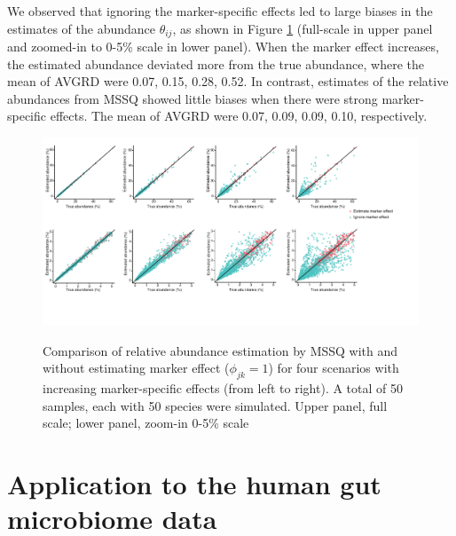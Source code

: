 We observed that ignoring the marker-specific effects led to large biases in  the estimates of the abundance $\theta_{ij}$, as shown in Figure \ref{F33_2016_02_07_Abundance_Estimation_Scale5_100_Merge} (full-scale in upper panel and zoomed-in to 0-5\% scale in lower panel). When the marker effect increases, the estimated abundance deviated more from the true abundance, where the mean of AVGRD were  0.07, 0.15, 0.28, 0.52.  In contrast, estimates of the relative abundances from MSSQ showed  little biases when there were strong marker-specific effects. The mean of AVGRD were 0.07, 0.09, 0.09, 0.10, respectively. 

\begin{figure}[ht]
	\centering
	{\includegraphics[scale=0.53,trim=0 60 20 0,clip]{Figure/F33_2016_02_07_Abundance_Estimation_Scale5_100_Merge.pdf}}
	\caption[Comparison of relative abundance estimation by MSSQ  with and without estimating marker effect]{Comparison of relative abundance estimation by MSSQ  with and without estimating marker effect ($\phi_{jk}=1$) for four scenarios with increasing marker-specific effects (from left to right). A total of 50 samples, each with 50 species were simulated. Upper panel, full scale; lower panel, zoom-in 0-5\% scale  }
	\label{F33_2016_02_07_Abundance_Estimation_Scale5_100_Merge}
\end{figure}



\section{Application to the human gut microbiome data}
\label{sec:realdata}
